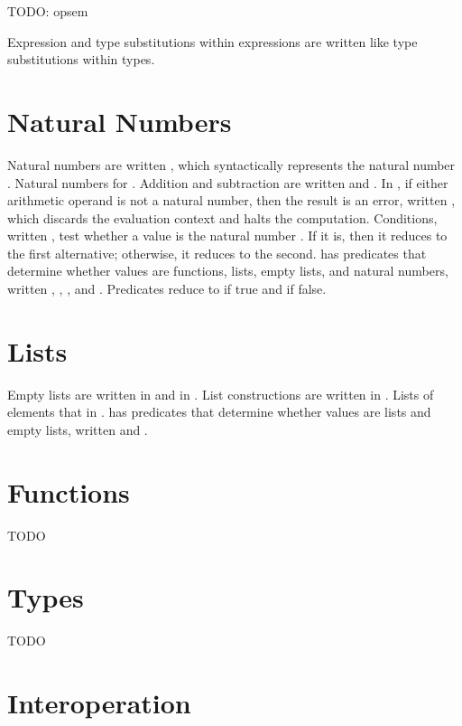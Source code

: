 TODO: opsem

Expression and type substitutions within expressions are written like type substitutions within types.

\section{Natural Numbers}

Natural numbers are written \expnum{\varnum}, which syntactically represents the natural number \varnum. Natural numbers \havetype{\tynum} for \thehaskellml. Addition and subtraction are written \expadd{\varexp}{\varexp} and \expsub{\varexp}{\varexp}. In \thescheme, if either arithmetic operand is not a natural number, then the result is an error, written \expwrongd{\errnum}, which discards the evaluation context and halts the computation. Conditions, written \expif{\varexp}{\varexp}{\varexp}, test whether a value is the natural number . If it is, then it reduces to the first alternative; otherwise, it reduces to the second. \Thescheme has predicates that determine whether values are functions, lists, empty lists, and natural numbers, written \exppfun{\varexps}, \expplist{\varexps}, \exppnull{\varexps}, and \exppnum{\varexps}. Predicates reduce to  if true and  if false.

\section{Lists}

Empty lists are written \expnils{\varty} in \thehaskellml and \expnild in \thescheme. List constructions are written \expcons{\varexp}{\varexp} in \thehaskellmlscheme. Lists of elements that \havetype{\varty} in \thehaskellml \havetype{\tylist{\varty}}. \Thescheme has predicates that determine whether values are lists and empty lists, written \expplist{\varexp} and \exppnull{\varexp}.

\section{Functions}

TODO

\section{Types}

TODO

\section{Interoperation}

